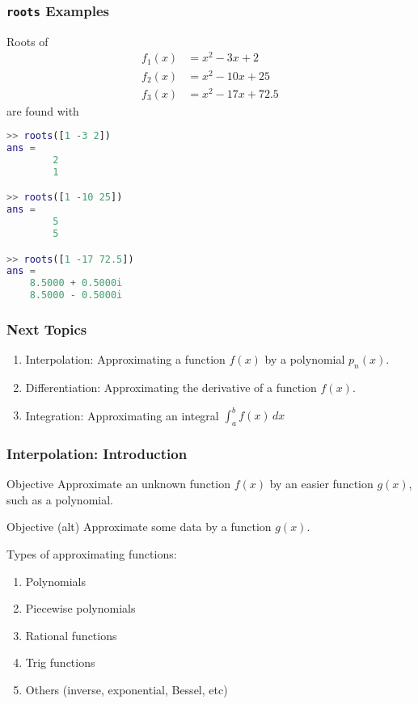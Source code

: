 \documentclass[10pt]{beamer}
\begin{document}
\begin{frame}
\frametitle{\texttt{roots} Examples}

Roots of
\begin{align*}
    f_1(x) &= x^2 -  3x +  2    \\
    f_2(x) &= x^2 - 10x + 25    \\
    f_3(x) &= x^2 - 17x + 72.5
\end{align*}
are found with
\begin{lstlisting}[language=matlab]
>> roots([1 -3 2])
ans =
        2
        1

>> roots([1 -10 25])
ans =
        5
        5

>> roots([1 -17 72.5])
ans =
    8.5000 + 0.5000i
    8.5000 - 0.5000i
\end{lstlisting}


\end{frame}
\begin{frame}
\frametitle{Next Topics}

\begin{enumerate}
  \item Interpolation: Approximating a function $f(x)$ by a polynomial
$p_n(x)$.
  \item Differentiation: Approximating the derivative of a function
$f(x)$.
  \item Integration: Approximating an integral $\int_a^b f(x)\,dx$
\end{enumerate}
\end{frame}
\begin{frame}
\frametitle{Interpolation: Introduction}
  \begin{block}{Objective}
    Approximate an unknown function $f(x)$ by an easier function $g(x)$,
such as a polynomial. 
  \end{block}
  \begin{block}{Objective (alt)}
  Approximate some data by a function $g(x)$. 
  \end{block}
Types of approximating functions:
\begin{enumerate}
  \item Polynomials
  \item Piecewise polynomials
  \item Rational functions
  \item Trig functions
  \item Others (inverse, exponential, Bessel, etc)
\end{enumerate}
\end{frame}
\end{document}

